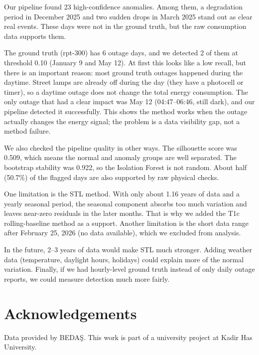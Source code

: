 \documentclass[11pt,a4paper]{article}
\begin{document}
Our pipeline found 23 high-confidence anomalies. Among them, a degradation period in December 2025 and two sudden drops in March 2025 stand out as clear real events. These days were not in the ground truth, but the raw consumption data supports them.

The ground truth (rpt-300) has 6 outage days, and we detected 2 of them at threshold 0.10 (January 9 and May 12). At first this looks like a low recall, but there is an important reason: most ground truth outages happened during the daytime. Street lamps are already off during the day (they have a photocell or timer), so a daytime outage does not change the total energy consumption. The only outage that had a clear impact was May 12 (04:47--06:46, still dark), and our pipeline detected it successfully. This shows the method works when the outage actually changes the energy signal; the problem is a data visibility gap, not a method failure.

We also checked the pipeline quality in other ways. The silhouette score was 0.509, which means the normal and anomaly groups are well separated. The bootstrap stability was 0.922, so the Isolation Forest is not random. About half (50.7\%) of the flagged days are also supported by raw physical checks.

One limitation is the STL method. With only about 1.16 years of data and a yearly seasonal period, the seasonal component absorbs too much variation and leaves near-zero residuals in the later months. That is why we added the T1c rolling-baseline method as a support. Another limitation is the short data range after February 25, 2026 (no data available), which we excluded from analysis.

In the future, 2--3 years of data would make STL much stronger. Adding weather data (temperature, daylight hours, holidays) could explain more of the normal variation. Finally, if we had hourly-level ground truth instead of only daily outage reports, we could measure detection much more fairly.

\section*{Acknowledgements}
Data provided by BEDAŞ. This work is part of a university project at Kadir Has University.
\end{document}
